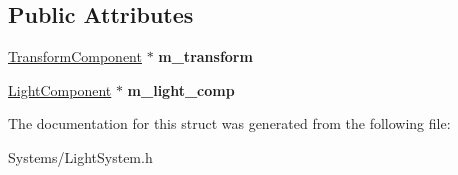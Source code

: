 \subsection*{Public Attributes}
\begin{DoxyCompactItemize}
\item 
\mbox{\label{structLightCompNode_ac195b52011c74da26f4f83ad76ff5c56}} 
\hyperlink{classTransformComponent}{Transform\+Component} $\ast$ {\bfseries m\+\_\+transform}
\item 
\mbox{\label{structLightCompNode_a8d0555db682440eeb6c5200a274f0113}} 
\hyperlink{classLightComponent}{Light\+Component} $\ast$ {\bfseries m\+\_\+light\+\_\+comp}
\end{DoxyCompactItemize}


The documentation for this struct was generated from the following file\+:\begin{DoxyCompactItemize}
\item 
Systems/Light\+System.\+h\end{DoxyCompactItemize}
